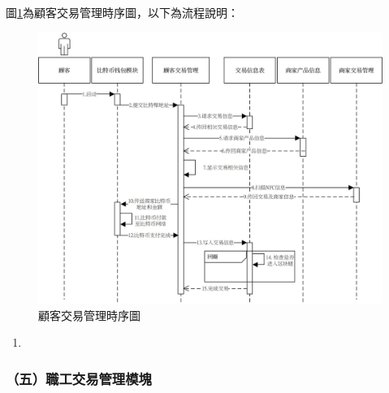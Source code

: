 	

	圖\ref{time5}為顧客交易管理時序圖，以下為流程說明：

	\begin{figure}[htbp]
		\centering
		\includegraphics[width = 1\textwidth]{time5.jpg}
		\caption{顧客交易管理時序圖}\label{time5}
	\end{figure}



	\begin{enumerate}
	\item
	\end{enumerate}


\subsubsection{（五）職工交易管理模塊}

